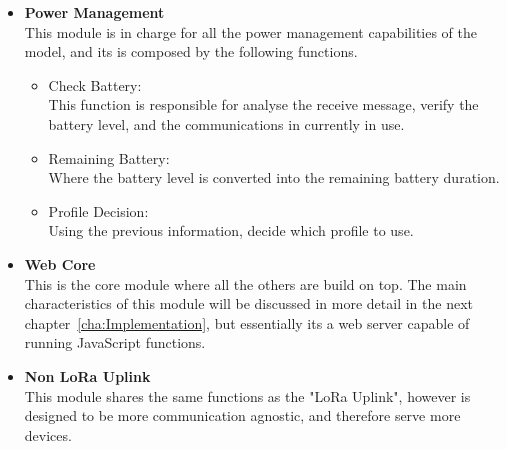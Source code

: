 \begin{itemize}
   \item \textbf{Power Management}\\
   This module is in charge for all the power management capabilities of the model, and its is composed by the following functions. 
   \begin{itemize}
     \item Check Battery: \\This function is responsible for analyse the receive message, verify the battery level, and the communications in currently in use. 
   \end{itemize}
   \begin{itemize}
     \item Remaining Battery: \\Where the battery level is converted into the remaining battery duration.
   \end{itemize}
   \begin{itemize}
     \item Profile Decision: \\Using the previous information, decide which profile to use.
   \end{itemize}
\end{itemize}

\begin{itemize}
\item \textbf{Web Core} \\
This is the core module where all the others are build on top. The main characteristics of this module will be discussed in more detail in the next chapter~\ref{cha:Implementation}, but essentially its a web server capable of running JavaScript functions.
\end{itemize}

\begin{itemize}
   \item \textbf{Non LoRa Uplink} \\
    This module shares the same functions as the "LoRa Uplink", however is designed to be more communication agnostic, and therefore serve more devices. 
\end{itemize}


